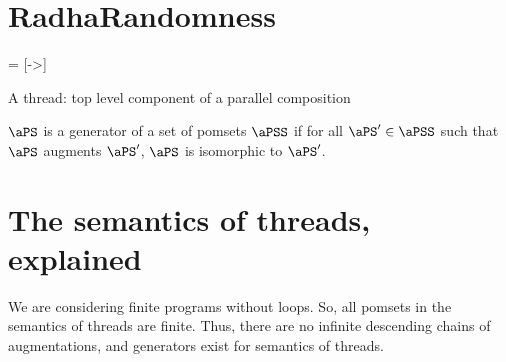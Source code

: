 \section{RadhaRandomness}

 = [->]
\newcommand{\fvarsc}{\mathit{varsc}}
\newcommand{\rvarsc}{\ensuremath{\mathrel{\mathsf{varsc}}}}%
\newcommand{\xvarsc}{\xarrowtikz{varsc}{varsc}}

\newcommand{\reads}{\mathit{Reads}}

\newcommand{\writes}{\mathit{Writes}}
\newcommand{\pomf}[1]{Fun_{#1}}
\newcommand{\pomFn}{\mathit{PomFn}}
\newcommand{\power}{\mathcal{P}}
\newcommand{\aFn}{F}
\newcommand{\aRSet}{R}
\newcommand{\bRSet}{S}
\newcommand{\aWSet}{U}
\newcommand{\bWSet}{V}
\newcommand{\aWrite}{\aAct_w}
\newcommand{\bPS}{\aPS'}

\begin{definition}
A thread: top level component of a parallel composition
\end{definition}



\begin{definition}
$\aPS$ is a generator of a set of pomsets $\aPSS$ if for all $\bPS \in \aPSS$ such that $\aPS$ augments $\bPS$, $\aPS$ is isomorphic to $\bPS$.
\end{definition}


\section{The semantics  of threads, explained}
We are considering finite programs without loops.  So,  all pomsets in the semantics of threads are finite.  Thus, there are no infinite descending chains of augmentations, and  generators exist for semantics of threads.

